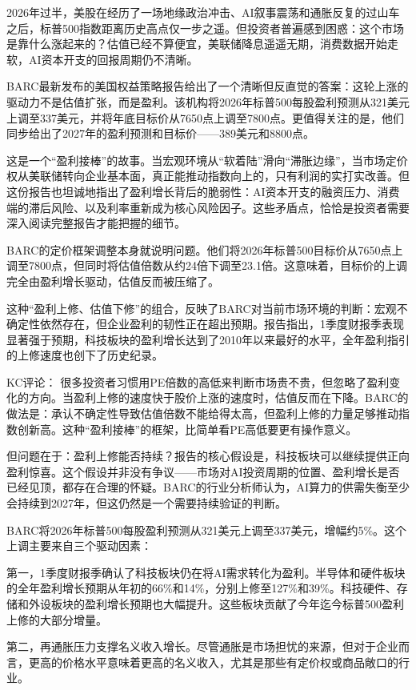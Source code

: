 \documentclass[11pt]{ctexart}
\begin{document}
2026年过半，美股在经历了一场地缘政治冲击、AI叙事震荡和通胀反复的过山车之后，标普500指数距离历史高点仅一步之遥。但投资者普遍感到困惑：这个市场是靠什么涨起来的？估值已经不算便宜，美联储降息遥遥无期，消费数据开始走软，AI资本开支的回报周期仍不清晰。

BARC最新发布的美国权益策略报告给出了一个清晰但反直觉的答案：这轮上涨的驱动力不是估值扩张，而是盈利。该机构将2026年标普500每股盈利预测从321美元上调至337美元，并将年底目标价从7650点上调至7800点。更值得关注的是，他们同步给出了2027年的盈利预测和目标价——389美元和8800点。

这是一个“盈利接棒”的故事。当宏观环境从“软着陆”滑向“滞胀边缘”，当市场定价权从美联储转向企业基本面，真正能推动指数向上的，只有利润的实打实改善。但这份报告也坦诚地指出了盈利增长背后的脆弱性：AI资本开支的融资压力、消费端的滞后风险、以及利率重新成为核心风险因子。这些矛盾点，恰恰是投资者需要深入阅读完整报告才能把握的细节。

BARC的定价框架调整本身就说明问题。他们将2026年标普500目标价从7650点上调至7800点，但同时将估值倍数从约24倍下调至23.1倍。这意味着，目标价的上调完全由盈利增长驱动，估值反而被压缩了。

这种“盈利上修、估值下修”的组合，反映了BARC对当前市场环境的判断：宏观不确定性依然存在，但企业盈利的韧性正在超出预期。报告指出，1季度财报季表现显著强于预期，科技板块的盈利增长达到了2010年以来最好的水平，全年盈利指引的上修速度也创下了历史纪录。

KC评论： 很多投资者习惯用PE倍数的高低来判断市场贵不贵，但忽略了盈利变化的方向。当盈利上修的速度快于股价上涨的速度时，估值反而在下降。BARC的做法是：承认不确定性导致估值倍数不能给得太高，但盈利上修的力量足够推动指数创新高。这种“盈利接棒”的框架，比简单看PE高低要更有操作意义。

但问题在于：盈利上修能否持续？报告的核心假设是，科技板块可以继续提供正向盈利惊喜。这个假设并非没有争议——市场对AI投资周期的位置、盈利增长是否已经见顶，都存在合理的怀疑。BARC的行业分析师认为，AI算力的供需失衡至少会持续到2027年，但这仍然是一个需要持续验证的判断。

BARC将2026年标普500每股盈利预测从321美元上调至337美元，增幅约5\%。这个上调主要来自三个驱动因素：

第一，1季度财报季确认了科技板块仍在将AI需求转化为盈利。半导体和硬件板块的全年盈利增长预期从年初的66\%和14\%，分别上修至127\%和39\%。科技硬件、存储和外设板块的盈利增长预期也大幅提升。这些板块贡献了今年迄今标普500盈利上修的大部分增量。

第二，再通胀压力支撑名义收入增长。尽管通胀是市场担忧的来源，但对于企业而言，更高的价格水平意味着更高的名义收入，尤其是那些有定价权或商品敞口的行业。
\end{document}
